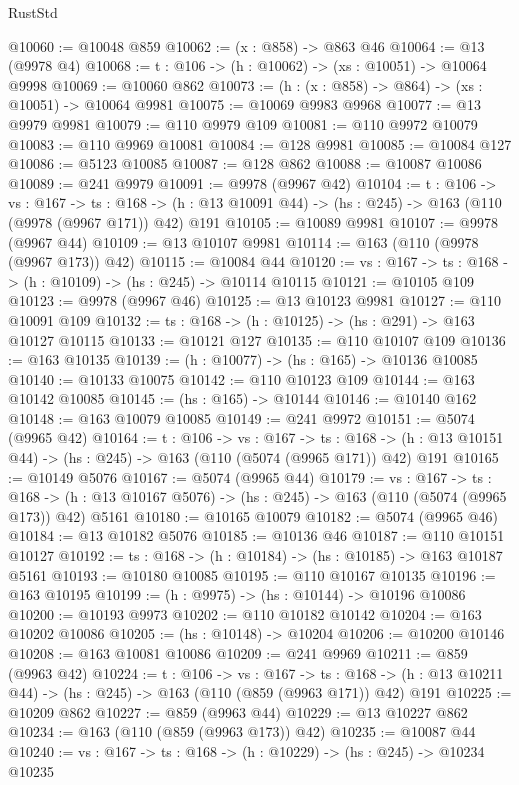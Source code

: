 \begin{lexlean}{RustStd}
\begin{coremodule}
@10060 := @10048 @859
@10062 := (x : @858) -> @863 @46
@10064 := @13 (@9978 @4)
@10068 := {t : @106} -> (h : @10062) -> (xs : @10051) -> @10064 @9998
@10069 := @10060 @862
@10073 := (h : (x : @858) -> @864) -> (xs : @10051) -> @10064 @9981
@10075 := @10069 @9983 @9968
@10077 := @13 @9979 @9981
@10079 := @110 @9979 @109
@10081 := @110 @9972 @10079
@10083 := @110 @9969 @10081
@10084 := @128 @9981
@10085 := @10084 @127
@10086 := @5123 @10085
@10087 := @128 @862
@10088 := @10087 @10086
@10089 := @241 @9979
@10091 := @9978 (@9967 @42)
@10104 := {t : @106} ->
  {vs : @167} ->
  {ts : @168} -> (h : @13 @10091 @44) -> (hs : @245) -> @163 (@110 (@9978 (@9967 @171)) @42) @191
@10105 := @10089 @9981
@10107 := @9978 (@9967 @44)
@10109 := @13 @10107 @9981
@10114 := @163 (@110 (@9978 (@9967 @173)) @42)
@10115 := @10084 @44
@10120 := {vs : @167} -> {ts : @168} -> (h : @10109) -> (hs : @245) -> @10114 @10115
@10121 := @10105 @109
@10123 := @9978 (@9967 @46)
@10125 := @13 @10123 @9981
@10127 := @110 @10091 @109
@10132 := {ts : @168} -> (h : @10125) -> (hs : @291) -> @163 @10127 @10115
@10133 := @10121 @127
@10135 := @110 @10107 @109
@10136 := @163 @10135
@10139 := (h : @10077) -> (hs : @165) -> @10136 @10085
@10140 := @10133 @10075
@10142 := @110 @10123 @109
@10144 := @163 @10142 @10085
@10145 := (hs : @165) -> @10144
@10146 := @10140 @162
@10148 := @163 @10079 @10085
@10149 := @241 @9972
@10151 := @5074 (@9965 @42)
@10164 := {t : @106} ->
  {vs : @167} ->
  {ts : @168} -> (h : @13 @10151 @44) -> (hs : @245) -> @163 (@110 (@5074 (@9965 @171)) @42) @191
@10165 := @10149 @5076
@10167 := @5074 (@9965 @44)
@10179 := {vs : @167} ->
  {ts : @168} -> (h : @13 @10167 @5076) -> (hs : @245) -> @163 (@110 (@5074 (@9965 @173)) @42) @5161
@10180 := @10165 @10079
@10182 := @5074 (@9965 @46)
@10184 := @13 @10182 @5076
@10185 := @10136 @46
@10187 := @110 @10151 @10127
@10192 := {ts : @168} -> (h : @10184) -> (hs : @10185) -> @163 @10187 @5161
@10193 := @10180 @10085
@10195 := @110 @10167 @10135
@10196 := @163 @10195
@10199 := (h : @9975) -> (hs : @10144) -> @10196 @10086
@10200 := @10193 @9973
@10202 := @110 @10182 @10142
@10204 := @163 @10202 @10086
@10205 := (hs : @10148) -> @10204
@10206 := @10200 @10146
@10208 := @163 @10081 @10086
@10209 := @241 @9969
@10211 := @859 (@9963 @42)
@10224 := {t : @106} ->
  {vs : @167} ->
  {ts : @168} -> (h : @13 @10211 @44) -> (hs : @245) -> @163 (@110 (@859 (@9963 @171)) @42) @191
@10225 := @10209 @862
@10227 := @859 (@9963 @44)
@10229 := @13 @10227 @862
@10234 := @163 (@110 (@859 (@9963 @173)) @42)
@10235 := @10087 @44
@10240 := {vs : @167} -> {ts : @168} -> (h : @10229) -> (hs : @245) -> @10234 @10235

\end{coremodule}
\end{lexlean}
